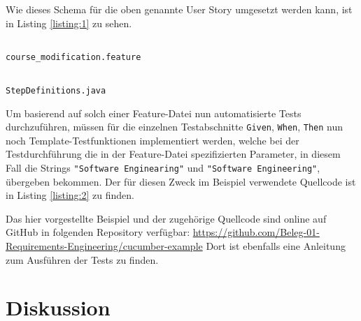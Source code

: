\documentclass[acmtog]{acmart}
\begin{document}
Wie dieses Schema für die oben genannte User Story umgesetzt werden kann, ist in Listing \ref{listing:1} zu sehen.

\begin{listing}[!h]
	\inputminted{cucumber}{cucumber/course_modification.feature}
	\vspace*{-1em}
	\caption{\texttt{course\_modification.feature}}
	\label{listing:1}
\end{listing}


\begin{listing}[!h]
	\begin{tcolorbox}[colframe=black, colback=white, opacityback=1.0, sharp corners, boxrule=.4pt, width=\linewidth-.8pt]
		\vspace{-.6em}
		\inputminted[linenos, firstline=9, breakafter=_, xleftmargin=2pt, numbersep=6pt, frame=none]{java}{cucumber/StepDefinitions.java}
		\vspace{-1em}
	\end{tcolorbox}
	\vspace{-1em}
	\caption{\texttt{StepDefinitions.java}}
	\label{listing:2}
\end{listing}

Um basierend auf solch einer Feature-Datei nun automatisierte Tests durchzuführen, müssen für die einzelnen Testabschnitte
\texttt{Given}, \texttt{When}, \texttt{Then} nun noch Template-Testfunktionen implementiert werden, welche bei der Testdurchführung
die in der Feature-Datei spezifizierten Parameter, in diesem Fall die Strings \texttt{"Software Enginearing"} und
\texttt{"Software Engineering"}, übergeben bekommen.
Der für diesen Zweck im Beispiel verwendete Quellcode ist in Listing \ref{listing:2} zu finden.

Das hier vorgestellte Beispiel und der zugehörige Quellcode sind online auf GitHub in folgenden Repository verfügbar:
\url{https://github.com/Beleg-01-Requirements-Engineering/cucumber-example}%
Dort ist ebenfalls eine Anleitung zum Ausführen der Tests zu finden.


\section{Diskussion} \label{sec:diskussion}
\end{document}
